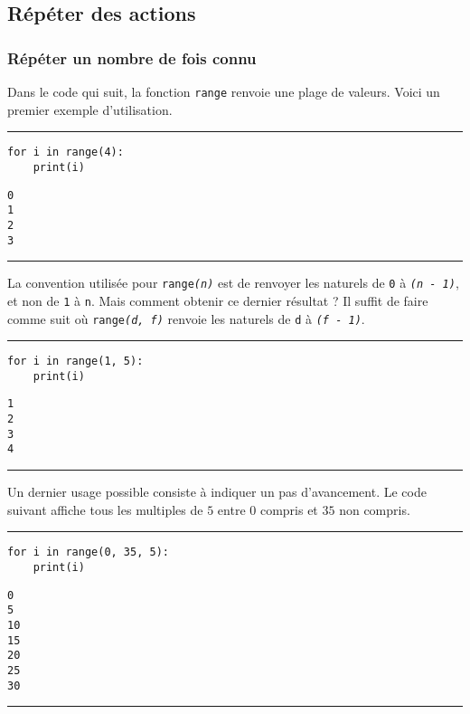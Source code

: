 \subsection{Répéter des actions}

\subsubsection{Répéter un nombre de fois connu}

Dans le code qui suit, la fonction \texttt{range} renvoie une plage de valeurs. Voici un premier exemple d'utilisation.


\bigskip
{\hrule height .5mm}
\begin{verbatim}
for i in range(4):
    print(i)
\end{verbatim}
 \color{ForestGreen}
\vspace{-1.5em}
\begin{verbatim}
0
1
2
3
\end{verbatim} \color{Black}
{\hrule height .5mm}
\bigskip


La convention utilisée pour \texttt{range\textit{(n)}} est de renvoyer les naturels de \texttt{0} à \texttt{\textit{(n - 1)}}, et non de \texttt{1} à \texttt{n}. Mais comment obtenir ce dernier résultat ? Il suffit de faire comme suit où \texttt{range\textit{(d, f)}} renvoie les naturels de \texttt{d} à \texttt{\textit{(f - 1)}}.


\bigskip
{\hrule height .5mm}
\begin{verbatim}
for i in range(1, 5):
    print(i)
\end{verbatim}
\newpage
{} \color{ForestGreen}
\vspace{-1.5em}
\begin{verbatim}
1
2
3
4
\end{verbatim} \color{Black}
{\hrule height .5mm}
\bigskip


Un dernier usage possible consiste à indiquer un pas d'avancement. Le code suivant affiche tous les multiples de $5$ entre $0$ compris et $35$ non compris.


\bigskip
{\hrule height .5mm}
\begin{verbatim}
for i in range(0, 35, 5):
    print(i)
\end{verbatim}
 \color{ForestGreen}
\vspace{-1.5em}
\begin{verbatim}
0
5
10
15
20
25
30
\end{verbatim} \color{Black}
{\hrule height .5mm}
\bigskip


